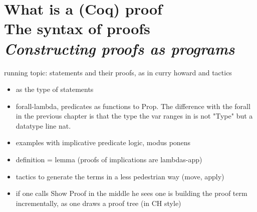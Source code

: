 \chapter{What is a (Coq) proof\\The syntax of proofs\\[2ex]\Large\itshape Constructing proofs as programs}

% 
% 
% 

running topic: statements and their proofs, as in curry howard and
tactics

\begin{itemize}
\item {} as the type of statements
\item forall-lambda, predicates as functions to Prop.  The difference with the forall in the previous chapter is that the type the var ranges in is not "Type" but a datatype line nat.
\item examples with implicative predicate logic, modus ponens
\item definition = lemma (proofs of implications are lambdas-app)
\item tactics to generate the terms in a less pedestrian way (move, apply)
\item if one calls Show Proof in the middle he sees one is building
	the proof term incrementally, as one draws a proof tree (in CH style)
\end{itemize}

